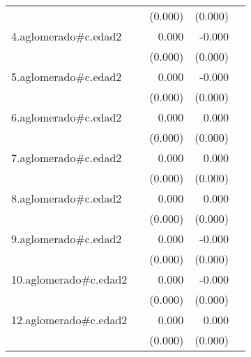 {\begin{longtable}{l*{4}{D{.}{.}{-1}}}
            &                     &     (0.000)         &     (0.000)         &                     \\
\addlinespace
4.aglomerado#c.edad2&                     &       0.000         &      -0.000\sym{**} &                     \\
            &                     &     (0.000)         &     (0.000)         &                     \\
\addlinespace
5.aglomerado#c.edad2&                     &       0.000         &      -0.000\sym{*}  &                     \\
            &                     &     (0.000)         &     (0.000)         &                     \\
\addlinespace
6.aglomerado#c.edad2&                     &       0.000\sym{*}  &       0.000         &                     \\
            &                     &     (0.000)         &     (0.000)         &                     \\
\addlinespace
7.aglomerado#c.edad2&                     &       0.000\sym{*}  &       0.000         &                     \\
            &                     &     (0.000)         &     (0.000)         &                     \\
\addlinespace
8.aglomerado#c.edad2&                     &       0.000\sym{*}  &       0.000         &                     \\
            &                     &     (0.000)         &     (0.000)         &                     \\
\addlinespace
9.aglomerado#c.edad2&                     &       0.000         &      -0.000\sym{*}  &                     \\
            &                     &     (0.000)         &     (0.000)         &                     \\
\addlinespace
10.aglomerado#c.edad2&                     &       0.000\sym{*}  &      -0.000         &                     \\
            &                     &     (0.000)         &     (0.000)         &                     \\
\addlinespace
12.aglomerado#c.edad2&                     &       0.000\sym{*}  &       0.000         &                     \\
            &                     &     (0.000)         &     (0.000)         &                     \\

\end{longtable}}
